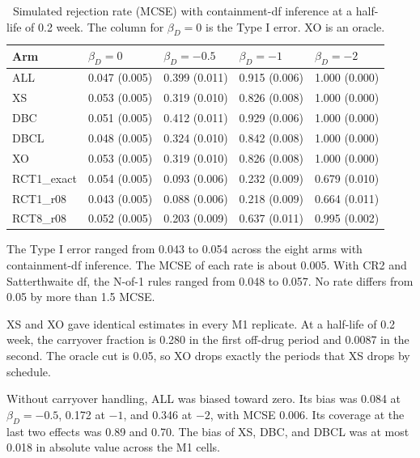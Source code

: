 \documentclass[
  11pt,
]{article}
\begin{document}
\begin{table}[!h]
\centering
\caption{\label{tab:sim-m1}Simulated rejection rate (MCSE) with containment-df inference at a half-life of 0.2 week. The column for $\beta_D = 0$ is the Type I error. XO is an oracle.}
\centering
\fontsize{9}{11}\selectfont
\begin{tabular}[t]{lllll}
\toprule
Arm & $\beta_D = 0$ & $\beta_D = -0.5$ & $\beta_D = -1$ & $\beta_D = -2$\\
\midrule
ALL & 0.047 (0.005) & 0.399 (0.011) & 0.915 (0.006) & 1.000 (0.000)\\
XS & 0.053 (0.005) & 0.319 (0.010) & 0.826 (0.008) & 1.000 (0.000)\\
DBC & 0.051 (0.005) & 0.412 (0.011) & 0.929 (0.006) & 1.000 (0.000)\\
DBCL & 0.048 (0.005) & 0.324 (0.010) & 0.842 (0.008) & 1.000 (0.000)\\
XO & 0.053 (0.005) & 0.319 (0.010) & 0.826 (0.008) & 1.000 (0.000)\\
\addlinespace
RCT1\_exact & 0.054 (0.005) & 0.093 (0.006) & 0.232 (0.009) & 0.679 (0.010)\\
RCT1\_r08 & 0.043 (0.005) & 0.088 (0.006) & 0.218 (0.009) & 0.664 (0.011)\\
RCT8\_r08 & 0.052 (0.005) & 0.203 (0.009) & 0.637 (0.011) & 0.995 (0.002)\\
\bottomrule
\end{tabular}
\end{table}

The Type I error ranged from 0.043 to 0.054 across the eight arms with containment-df inference. The MCSE of each rate is about 0.005. With CR2 and Satterthwaite df, the N-of-1 rules ranged from 0.048 to 0.057. No rate differs from 0.05 by more than 1.5 MCSE.

XS and XO gave identical estimates in every M1 replicate. At a half-life of 0.2 week, the carryover fraction is 0.280 in the first off-drug period and 0.0087 in the second. The oracle cut is 0.05, so XO drops exactly the periods that XS drops by schedule.

Without carryover handling, ALL was biased toward zero. Its bias was 0.084 at \(\beta_D = -0.5\), 0.172 at \(-1\), and 0.346 at \(-2\), with MCSE 0.006. Its coverage at the last two effects was 0.89 and 0.70. The bias of XS, DBC, and DBCL was at most 0.018 in absolute value across the M1 cells.
\end{document}
